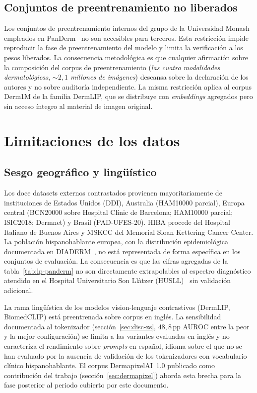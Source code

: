 \subsection{Conjuntos de preentrenamiento no liberados}
\label{sec:lim-preentrenamiento}

Los conjuntos de preentrenamiento internos del grupo de la
Universidad Monash empleados en PanDerm~\cite{panderm2025} no son
accesibles para terceros. Esta restricción impide reproducir la
fase de preentrenamiento del modelo y limita la verificación a los
pesos liberados. La consecuencia metodológica es que cualquier
afirmación sobre la composición del corpus de preentrenamiento
(\emph{las cuatro modalidades dermatológicas}, \emph{$\sim 2{,}1$
millones de imágenes}) descansa sobre la declaración de los autores
y no sobre auditoría independiente. La misma restricción aplica al
corpus Derm1M de la familia DermLIP, que se distribuye con
\emph{embeddings} agregados pero sin acceso íntegro al material de
imagen original.

\section{Limitaciones de los datos}
\label{sec:lim-datos}

\subsection{Sesgo geográfico y lingüístico}
\label{sec:lim-geografico}

Los doce datasets externos contrastados provienen mayoritariamente
de instituciones de Estados Unidos (DDI), Australia
(HAM10000 parcial), Europa central (BCN20000 sobre Hospital Clínic
de Barcelona; HAM10000 parcial; ISIC2018; Dermnet) y Brasil
(PAD-UFES-20). HIBA procede del Hospital Italiano de Buenos Aires
y MSKCC del Memorial Sloan Kettering Cancer Center. La población
hispanohablante europea, con la distribución epidemiológica
documentada en DIADERM~\cite{diaderm2018}, no está representada de
forma específica en los conjuntos de evaluación. La consecuencia
es que las cifras agregadas de la tabla~\ref{tab:lp-panderm} no
son directamente extrapolables al espectro diagnóstico atendido en
el Hospital Universitario Son Llàtzer
(HUSLL)~\cite{taberner2010_motivos} sin validación adicional.

La rama lingüística de los modelos vision-lenguaje contrastivos
(DermLIP, BiomedCLIP) está preentrenada sobre corpus en inglés. La
sensibilidad documentada al tokenizador (secci\'on~\ref{sec:disc-zs},
$48{,}8$\,pp AUROC entre la peor y la mejor configuración) se
limita a las variantes evaluadas en inglés y no caracteriza el
rendimiento sobre \emph{prompts} en español, idioma sobre el que
no se han evaluado por la ausencia de validación de los
tokenizadores con vocabulario clínico hispanohablante. El corpus
DermapixelAI~1.0 publicado como contribución del trabajo
(secci\'on~\ref{sec:dermapixel}) aborda esta brecha para la fase
posterior al periodo cubierto por este documento.

